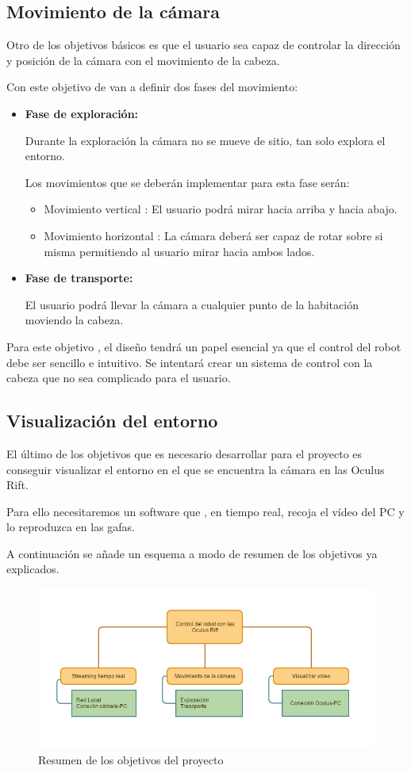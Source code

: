 \documentclass[twoside, 12pt]{epstfg}
\begin{document}
\subsection{Movimiento de la cámara}
Otro de los objetivos básicos es que el usuario sea capaz de controlar la dirección y posición de la cámara con el movimiento de la cabeza.

Con este objetivo de van a definir dos fases del movimiento:
\begin{itemize}
	\item \textbf{Fase de exploración:}
	
	Durante la exploración la cámara no se mueve de sitio, tan solo explora el entorno.
	
	Los movimientos que se deberán implementar para esta fase serán:
	\begin{itemize}
		\item Movimiento vertical : El usuario podrá mirar hacia arriba y hacia abajo.
		\item Movimiento horizontal : La cámara deberá ser capaz de rotar sobre si misma permitiendo al usuario mirar hacia ambos lados.
	\end{itemize}
	\item \textbf{Fase de transporte:}
	
	El usuario podrá llevar la cámara a cualquier punto de la habitación moviendo la cabeza.
	
\end{itemize}

Para este objetivo , el diseño tendrá un papel esencial ya que el control del robot debe ser sencillo e intuitivo. Se intentará crear un sistema de control con la cabeza que no sea complicado para el usuario.

\subsection{Visualización del entorno}
El último de los objetivos que es necesario desarrollar para el proyecto es conseguir visualizar el entorno en el que se encuentra la cámara en las Oculus Rift.

Para ello necesitaremos un software que , en tiempo real, recoja el vídeo del PC y lo reproduzca en las gafas. 


A continuación se añade un esquema a modo de resumen de los objetivos ya explicados.

\begin{figure}[h!]
	\centerline{
		\mbox{\includegraphics[width=7.00in]{images/objetivos.png}}
	}
	\caption{Resumen de los objetivos del proyecto}
\end{figure}
\end{document}
